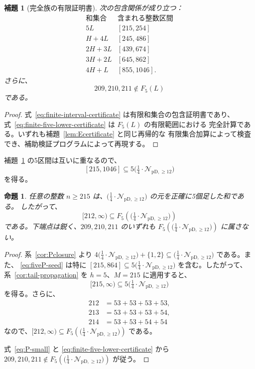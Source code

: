 \documentclass[12pt]{ltjsarticle}
\theoremstyle{plain}
\newtheorem{proposition}[theorem]{命題}
\newtheorem{lemma}[theorem]{補題}
\theoremstyle{definition}
\theoremstyle{plain}
\newcommand{\Pset}{%
  \bigl(\tfrac{1}{4}\cdot\mathcal{N}_{\mathrm{pD},\geq 12}\bigr)%
}
\begin{document}
\begin{lemma}[完全族の有限証明書]\label{lem:finitefive}
次の包含関係が成り立つ：
\begin{equation}\label{eq:finite-interval-certificate}
\begin{array}{c|c}
\text{和集合}&\text{含まれる整数区間}\\ \hline
5L &[215,254]\\
H+4L &[245,486]\\
2H+3L &[439,674]\\
3H+2L &[645,862]\\
4H+L &[855,1046].
\end{array}
\end{equation}
さらに、
\begin{equation}\label{eq:finite-five-lower-certificate}
 209,210,211\notin F_5(L)
\end{equation}
である。
\end{lemma}

\begin{proof}
式~\eqref{eq:finite-interval-certificate} は有限和集合の包含証明書であり、
式~\eqref{eq:finite-five-lower-certificate} は $F_5(L)$ の有限範囲における
完全計算である。いずれも補題~\ref{lem:Ecertificate} と同じ再帰的な
有限集合加算によって検査でき、補助検証プログラムによって再現する。
\end{proof}

補題~\ref{lem:finitefive} の5区間は互いに重なるので、
\begin{equation}\label{eq:fiveP-seed}
 [215,1046]\subseteq5\Pset
\end{equation}
を得る。

\begin{proposition}\label{prop:fiveP}
任意の整数 $n\geq215$ は、$\Pset$ の元を正確に5個足した和である。
したがって、
\[
 [212,\infty)\subseteq F_5(\Pset)
\]
である。下端点は鋭く、$209,210,211$ のいずれも
$F_5(\Pset)$ に属さない。
\end{proposition}

\begin{proof}
系~\ref{cor:Pclosure} より
$4\Pset+\{1,2\}\subseteq\Pset$ である。また、
\eqref{eq:fiveP-seed} は特に
$[215,864]\subseteq5\Pset$ を含む。したがって、
系~\ref{cor:tail-propagation} を $h=5$、$M=215$ に適用すると、
\[
 [215,\infty)\subseteq5\Pset
\]
を得る。さらに、
\[
\begin{aligned}
212&=53+53+53+53,\\
213&=53+53+53+54,\\
214&=53+53+54+54
\end{aligned}
\]
なので、$[212,\infty)\subseteq F_5(\Pset)$ である。

式~\eqref{eq:P-small} と \eqref{eq:finite-five-lower-certificate} から
$209,210,211\notin F_5(\Pset)$ が従う。
\end{proof}
\end{document}
